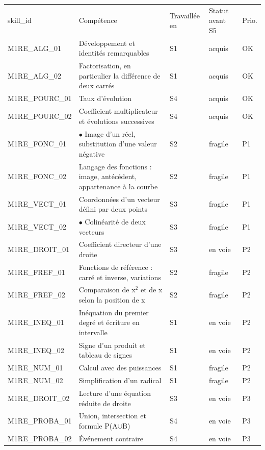 \documentclass[10pt,a4paper]{article}
\begin{document}
\par\noindent\begin{tabularx}{\linewidth}{>{\ttfamily\scriptsize}p{27mm} X >{\scriptsize}p{16mm} >{\scriptsize}p{20mm} >{\scriptsize\centering\arraybackslash}p{9mm}}
\rowcolor{Navy}\color{white}\scriptsize skill\_id & \color{white}Compétence & \color{white}Travaillée en & \color{white}Statut avant S5 & \color{white}Prio. \\
M1RE\_ALG\_01 & Développement et identités remarquables & S1 & acquis & OK \\
M1RE\_ALG\_02 & Factorisation, en particulier la différence de deux carrés & S1 & acquis & OK \\
M1RE\_POURC\_01 & Taux d'évolution & S4 & acquis & OK \\
M1RE\_POURC\_02 & Coefficient multiplicateur et évolutions successives & S4 & acquis & OK \\
M1RE\_FONC\_01 & $\bullet$ Image d'un réel, substitution d'une valeur négative & S2 & fragile & P1 \\
M1RE\_FONC\_02 & Langage des fonctions : image, antécédent, appartenance à la courbe & S2 & fragile & P1 \\
M1RE\_VECT\_01 & Coordonnées d'un vecteur défini par deux points & S3 & fragile & P1 \\
M1RE\_VECT\_02 & $\bullet$ Colinéarité de deux vecteurs & S3 & fragile & P1 \\
M1RE\_DROIT\_01 & Coefficient directeur d'une droite & S3 & en voie & P2 \\
M1RE\_FREF\_01 & Fonctions de référence : carré et inverse, variations & S2 & fragile & P2 \\
M1RE\_FREF\_02 & Comparaison de x$^2$ et de x selon la position de x & S2 & fragile & P2 \\
M1RE\_INEQ\_01 & Inéquation du premier degré et écriture en intervalle & S1 & en voie & P2 \\
M1RE\_INEQ\_02 & Signe d'un produit et tableau de signes & S1 & en voie & P2 \\
M1RE\_NUM\_01 & Calcul avec des puissances & S1 & fragile & P2 \\
M1RE\_NUM\_02 & Simplification d'un radical & S1 & fragile & P2 \\
M1RE\_DROIT\_02 & Lecture d'une équation réduite de droite & S3 & en voie & P3 \\
M1RE\_PROBA\_01 & Union, intersection et formule P(A$\cup$B) & S4 & en voie & P3 \\
M1RE\_PROBA\_02 & Événement contraire & S4 & en voie & P3 \\
\end{tabularx}
\end{document}
